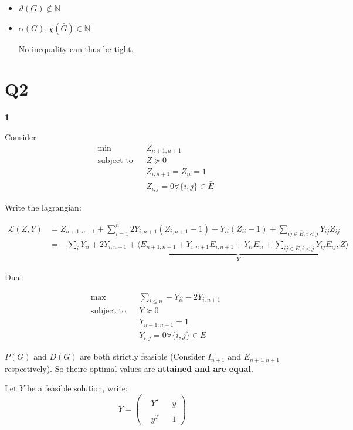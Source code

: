 \documentclass[11pt]{article}
\begin{document}
\begin{itemize}
\item \(\vartheta(G) \not \in \mathbb N\)
\item \(\alpha(G), \chi(\bar G) \in \mathbb N\)

No inequality can thus be tight.
\end{itemize}

\section{Q2}
\label{sec:orgheadline4}

\textbf{1}


Consider 
\begin{align*}
\tag{P(G)}
& \min
& & Z_{n+1, n+1} \\
& \text{subject to}
& & Z \succeq 0
\\&&& Z_{i,n+1} = Z_{ii} = 1
\\&&& Z_{i,j} = 0 \forall \{i, j\} \in \bar E
\end{align*}


Write the lagrangian:


\begin{align*}
\mathcal L(Z, Y)
&= Z_{n+1, n+1} + \sum_{i=1}^n 2 Y_{i, n+1} (Z_{i, n+1} - 1) + Y_{ii} (Z_{ii} - 1) + \sum_{ij \in \bar E, i < j} Y_{ij}Z_{ij}
\\&= - \sum_{i} Y_{ii} + 2Y_{i, n+1} + \langle \underbrace{E_{n+1, n+1} + Y_{i, n+1} E_{i, n+1} + Y_{ii} E_{ii} + \sum_{ij \in \bar E, i < j}Y_{ij}E_{ij}}_{Y}, Z \rangle
\end{align*}

Dual:


\begin{align*}
\tag{$D_1(G)$}
& \max
& & \sum_{i \le n} - Y_{ii} - 2 Y_{i, n+1}\\
& \text{subject to}
& & Y \succeq 0
\\&&& Y_{n+1, n+1} = 1
\\&&& Y_{i,j} = 0 \forall \{i, j\} \in  E
\end{align*}

\(P(G)\) and \(D(G)\) are both strictly feasible (Consider \(I_{n+1}\) and \(E_{n+1, n+1}\) respectively). So theire optimal values are \textbf{attained and are equal}.

Let \(Y\) be a feasible solution, write:
\[Y = \begin{pmatrix}
&&&\\
&Y'&&y\\
&&&\\
&y^T&&1\end{pmatrix}\]
\end{document}
